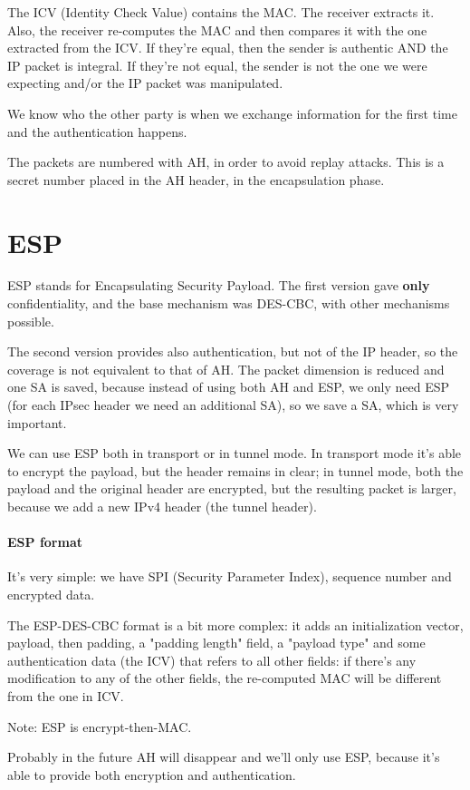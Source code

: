The ICV (Identity Check Value) contains the MAC. The receiver extracts it. Also, the receiver re-computes the MAC and then compares it with the one extracted from the ICV. If they're equal, then the sender is authentic AND the IP packet is integral. If they're not equal, the sender is not the one we were expecting and/or the IP packet was manipulated.

We know who the other party is when we exchange information for the first time and the authentication happens.

The packets are numbered with AH, in order to avoid replay attacks. This is a secret number placed in the AH header, in the encapsulation phase.

\section{ESP}
ESP stands for Encapsulating Security Payload. The first version gave \textbf{only} confidentiality, and the base mechanism was DES-CBC, with other mechanisms possible.

The second version provides also authentication, but not of the IP header, so the coverage is not equivalent to that of AH. The packet dimension is reduced and one SA is saved, because instead of using both AH and ESP, we only need ESP (for each IPsec header we need an additional SA), so we save a SA, which is very important.

We can use ESP both in transport or in tunnel mode. In transport mode it's able to encrypt the payload, but the header remains in clear; in tunnel mode, both the payload and the original header are encrypted, but the resulting packet is larger, because we add a new IPv4 header (the tunnel header).

\paragraph{ESP format}
It's very simple: we have SPI (Security Parameter Index), sequence number and encrypted data.

The ESP-DES-CBC format is a bit more complex: it adds an initialization vector, payload, then padding, a "padding length" field, a "payload type" and some authentication data (the ICV) that refers to all other fields: if there's any modification to any of the other fields, the re-computed MAC will be different from the one in ICV.

Note: ESP is encrypt-then-MAC.

Probably in the future AH will disappear and we'll only use ESP, because it's able to provide both encryption and authentication.


